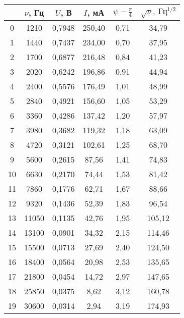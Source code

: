 \begin{table}
\centering
\begin{tabular}{|c|c|c|c|c|c|}
\hline
 & $\nu$, Гц & $U$, В & $I$, мА & $\psi-\frac{\pi}{4}$ & $\sqrt{\nu},\ Гц^{1/2}$ \\
\hline
0 & 1210 & 0,7948 & 250,40 & 0,71 & 34,79 \\
\cline{1-6}
1 & 1440 & 0,7437 & 234,00 & 0,70 & 37,95 \\
\cline{1-6}
2 & 1700 & 0,6877 & 216,48 & 0,84 & 41,23 \\
\cline{1-6}
3 & 2020 & 0,6242 & 196,86 & 0,91 & 44,94 \\
\cline{1-6}
4 & 2400 & 0,5576 & 176,49 & 1,01 & 48,99 \\
\cline{1-6}
5 & 2840 & 0,4921 & 156,60 & 1,05 & 53,29 \\
\cline{1-6}
6 & 3360 & 0,4286 & 137,42 & 1,20 & 57,97 \\
\cline{1-6}
7 & 3980 & 0,3682 & 119,32 & 1,18 & 63,09 \\
\cline{1-6}
8 & 4720 & 0,3121 & 102,61 & 1,25 & 68,70 \\
\cline{1-6}
9 & 5600 & 0,2615 & 87,56 & 1,41 & 74,83 \\
\cline{1-6}
10 & 6630 & 0,2170 & 74,44 & 1,53 & 81,42 \\
\cline{1-6}
11 & 7860 & 0,1776 & 62,71 & 1,67 & 88,66 \\
\cline{1-6}
12 & 9320 & 0,1436 & 52,39 & 1,83 & 96,54 \\
\cline{1-6}
13 & 11050 & 0,1135 & 42,76 & 1,95 & 105,12 \\
\cline{1-6}
14 & 13100 & 0,0901 & 34,32 & 2,15 & 114,46 \\
\cline{1-6}
15 & 15500 & 0,0713 & 27,69 & 2,40 & 124,50 \\
\cline{1-6}
16 & 18400 & 0,0564 & 20,98 & 2,53 & 135,65 \\
\cline{1-6}
17 & 21800 & 0,0454 & 14,72 & 2,97 & 147,65 \\
\cline{1-6}
18 & 25850 & 0,0375 & 8,62 & 3,12 & 160,78 \\
\cline{1-6}
19 & 30600 & 0,0314 & 2,94 & 3,19 & 174,93 \\
\cline{1-6}
\hline
\end{tabular}
\end{table}

